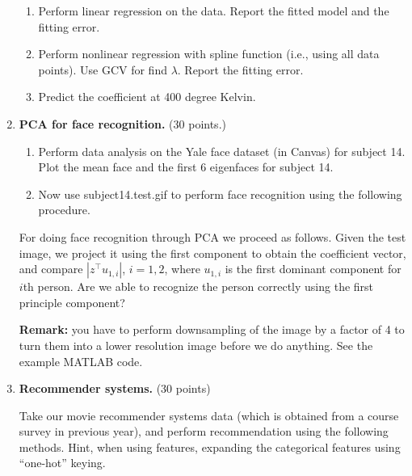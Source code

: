 \documentclass[11pt]{article}
\begin{document}
\begin{enumerate}
\begin{enumerate}

\item Perform linear regression on the data. Report the fitted model and the fitting error.
\item Perform nonlinear regression with spline function (i.e., using all data points). Use GCV for find $\lambda$. Report the fitting error. 
\item Predict the coefficient at 400 degree Kelvin.
\end{enumerate}

\item {\bf PCA for face recognition.} (30 points.)

\begin{enumerate}
\item Perform data analysis on the Yale face dataset (in Canvas) for subject 14. Plot the mean face and the first 6 eigenfaces for subject 14.
\item Now use \textsf{subject14.test.gif} to perform face recognition using the following procedure. 
\end{enumerate}

For doing face recognition through PCA we proceed as follows. Given the test image, we project it using the first component to obtain the coefficient vector, and compare $|z^\intercal u_{1, i}|$, $i = 1, 2$, where $u_{1, i}$ is the first dominant component for $i$th person. Are we able to recognize the person correctly using the first principle component? 

{\bf Remark:} you have to perform downsampling of the image by a factor of 4 to turn them into a lower resolution image before we do anything. See the example MATLAB code. 


\item {\bf Recommender systems.} (30 points)

Take our movie recommender systems data (which is obtained from a course survey in previous year), and perform recommendation using the following methods. Hint, when using features, expanding the categorical features using ``one-hot'' keying.


\end{enumerate}
\end{document}
